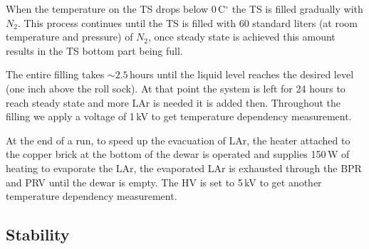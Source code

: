 \documentclass[a4paper,12pt]{article}
\begin{document}
When the temperature on the TS drops below 0\,C$^\circ$ the TS is filled gradually with $N_2$. This process continues until the TS is filled with 60 standard liters (at room temperature and pressure) of $N_2$, once steady state is achieved this amount results in the TS bottom part being full. 

The entire filling takes $\sim2.5$\,hours until the liquid level reaches the desired level (one inch above the roll sock). At that point the system is left for 24 hours to reach steady state and more LAr is needed it is added then. Throughout the filling we apply a voltage of 1\,kV to get temperature dependency measurement.

At the end of a run, to speed up the evacuation of LAr, the heater attached to the copper brick at the bottom of the dewar is operated and supplies 150\,W of heating to evaporate the LAr, the evaporated LAr is exhausted through the BPR and PRV until the dewar is empty. The HV is set to 5\,kV to get another temperature dependency measurement. 

\subsection{Stability}
\label{sec:stab}
\end{document}
